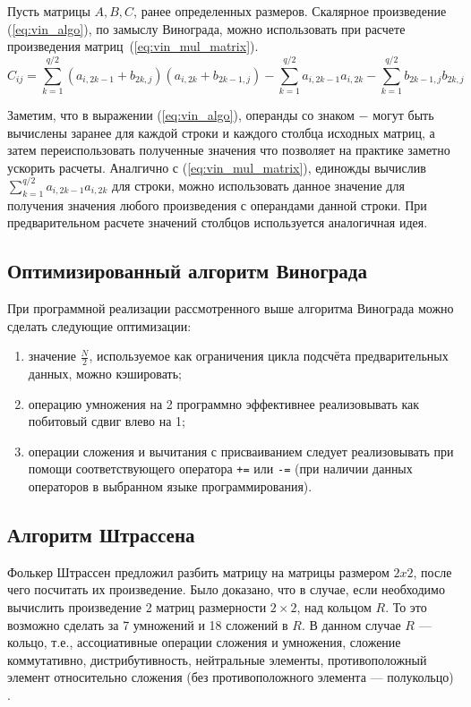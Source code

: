 Пусть матрицы $A, B, C$, ранее определенных размеров. Скалярное произведение (\ref{eq:vin_algo}), по замыслу Винограда, можно использовать при расчете 
произведения матриц~(\ref{eq:vin_mul_matrix}).
\begin{equation} 
	\label{eq:vin_mul_matrix}
	C_{ij} = \sum_{k=1}^{q/2}(a_{i,2k-1} + b_{2k,j})(a_{i,2k} + b_{2k-1,j}) - \sum_{k=1}^{q/2} a_{i,2k-1}a_{i,2k} - \sum_{k=1}^{q/2} b_{2k-1,j}b_{2k,j}
\end{equation}


Заметим, что в выражении (\ref{eq:vin_algo}), операнды со знаком $-$ могут быть вычислены заранее для каждой
строки и каждого столбца исходных матриц, а затем переиспользовать полученные значения что позволяет на практике заметно ускорить расчеты.
Аналгично с (\ref{eq:vin_mul_matrix}), единожды вычислив $\sum_{k=1}^{q/2}a_{i,2k-1}a_{i,2k}$ для строки, можно использовать данное
значение для получения значения любого произведения с операндами данной строки. При  предварительном расчете 
значений столбцов используется аналогичная идея.



\subsection{Оптимизированный алгоритм Винограда}

При программной реализации рассмотренного выше алгоритма Винограда можно сделать следующие оптимизации:
\begin{enumerate}
	\item значение $\frac{N}{2}$, используемое как ограничения цикла подсчёта предварительных данных, можно кэшировать;
	\item операцию умножения на 2 программно эффективнее реализовывать как побитовый сдвиг влево на 1;
	\item операции сложения и вычитания с присваиванием следует реализовывать при помощи соответствующего оператора \texttt{+=} или \texttt{-=} (при наличии данных операторов в выбранном языке программирования).
\end{enumerate}

\subsection{Алгоритм Штрассена}
Фолькер Штрассен предложил разбить матрицу на матрицы размером $2x2$, после чего посчитать их произведение. Было доказано, что в случае, если необходимо вычислить
произведение 2 матриц размерности $2\times2$, над кольцом $R$. То это возможно сделать за 7 умножений и 18 сложений в $R$. В данном случае $R$ — кольцо, т.е., ассоциативные операции сложения и умножения, сложение коммутативно, дистрибутивность, нейтральные элементы, противоположный элемент относительно
сложения (без противоположного элемента — полукольцо) \cite{stras}.

